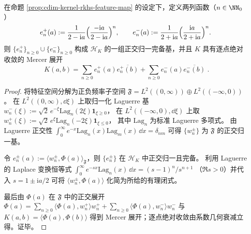 \begin{proposition}\label{prop:cdim-kernel-mercer-rational-basis}
在命题 \ref{prop:cdim-kernel-rkhs-feature-map} 的设定下，定义两列函数（\(n\in\NN_0\)）
\[
e_n^+(a):=\frac{1}{2-\mathrm{i}a}\Bigl(\frac{-\mathrm{i}a}{2-\mathrm{i}a}\Bigr)^n,
\qquad
e_n^-(a):=\frac{1}{2+\mathrm{i}a}\Bigl(\frac{\mathrm{i}a}{2+\mathrm{i}a}\Bigr)^n.
\]
则 \(\{e_n^+\}_{n\ge 0}\cup\{e_n^-\}_{n\ge 0}\) 构成 \(\mathcal H_K\) 的一组正交归一完备基，并且 \(K\) 具有逐点绝对收敛的 Mercer 展开
\[
\boxed{\;
K(a,b)=\sum_{n\ge 0} e_n^+(a)\overline{e_n^+(b)}+\sum_{n\ge 0} e_n^-(a)\overline{e_n^-(b)}\; }.
\]
\end{proposition}
\begin{proof}
将特征空间分解为正负频率子空间 \(\mathfrak F=L^2((0,\infty))\oplus L^2((-\infty,0))\)。
在 \(L^2((0,\infty),\dd\xi)\) 上取归一化 Laguerre 基
\(
w_n^-(\xi):=\sqrt{2}\,e^{-\xi}\mathrm{Lag}_n(2\xi)\mathbf 1_{\xi\ge 0}
\)，
在 \(L^2((-\infty,0),\dd\xi)\) 上取
\(
w_n^+(\xi):=\sqrt{2}\,e^{\xi}\mathrm{Lag}_n(-2\xi)\mathbf 1_{\xi\le 0}
\)，
其中 \(\mathrm{Lag}_n\) 为标准 Laguerre 多项式。
由 Laguerre 正交性 \(\int_0^\infty e^{-x}\mathrm{Lag}_n(x)\mathrm{Lag}_m(x)\,\dd x=\delta_{nm}\) 可得 \(\{w_n^\pm\}\) 为 \(\mathfrak F\) 的正交归一基。
\par
令 \(e_n^\pm(a):=\langle w_n^\pm,\Phi(a)\rangle_{\mathfrak F}\)，则 \(\{e_n^\pm\}\) 在 \(\mathcal H_K\) 中正交归一且完备。
利用 Laguerre 的 Laplace 变换恒等式
\(
\int_0^\infty e^{-sx}\mathrm{Lag}_n(x)\,\dd x=(s-1)^n/s^{n+1}
\)
（\(\Re s>0\)）并代入 \(s=1\pm \mathrm{i}a/2\) 可将 \(\langle w_n^\pm,\Phi(a)\rangle\) 化简为所给的有理闭式。
\par
最后由 \(\Phi(a)\) 在 \(\mathfrak F\) 中的正交展开 \(\Phi(a)=\sum_{n\ge 0}\langle\Phi(a),w_n^+\rangle w_n^+ +\sum_{n\ge 0}\langle\Phi(a),w_n^-\rangle w_n^-\) 与
\(
K(a,b)=\langle\Phi(a),\Phi(b)\rangle
\)
得到 Mercer 展开；逐点绝对收敛由系数几何衰减立得。证毕。
\end{proof}

